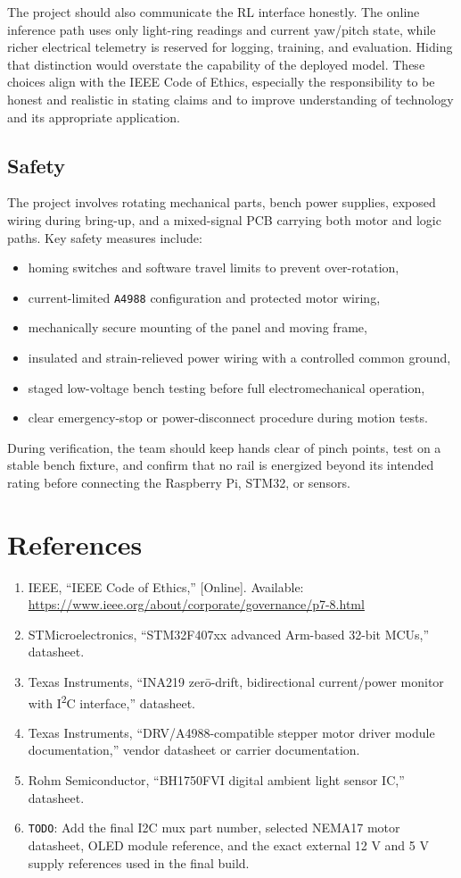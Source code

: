 \documentclass[11pt]{article}
\begin{document}
The project should also communicate the RL interface honestly. The online inference path uses only light-ring readings and current yaw/pitch state, while richer electrical telemetry is reserved for logging, training, and evaluation. Hiding that distinction would overstate the capability of the deployed model. These choices align with the IEEE Code of Ethics, especially the responsibility to be honest and realistic in stating claims and to improve understanding of technology and its appropriate application.

\subsection{Safety}
The project involves rotating mechanical parts, bench power supplies, exposed wiring during bring-up, and a mixed-signal PCB carrying both motor and logic paths. Key safety measures include:
\begin{itemize}
\item homing switches and software travel limits to prevent over-rotation,
\item current-limited \texttt{A4988} configuration and protected motor wiring,
\item mechanically secure mounting of the panel and moving frame,
\item insulated and strain-relieved power wiring with a controlled common ground,
\item staged low-voltage bench testing before full electromechanical operation,
\item clear emergency-stop or power-disconnect procedure during motion tests.
\end{itemize}

During verification, the team should keep hands clear of pinch points, test on a stable bench fixture, and confirm that no rail is energized beyond its intended rating before connecting the Raspberry Pi, STM32, or sensors.

\section{References}

\begin{enumerate}
\item IEEE, ``IEEE Code of Ethics,'' [Online]. Available: \url{https://www.ieee.org/about/corporate/governance/p7-8.html}
\item STMicroelectronics, ``STM32F407xx advanced Arm-based 32-bit MCUs,'' datasheet.
\item Texas Instruments, ``INA219 zer\=o-drift, bidirectional current/power monitor with I\textsuperscript{2}C interface,'' datasheet.
\item Texas Instruments, ``DRV/A4988-compatible stepper motor driver module documentation,'' vendor datasheet or carrier documentation.
\item Rohm Semiconductor, ``BH1750FVI digital ambient light sensor IC,'' datasheet.
\item \texttt{TODO}: Add the final I2C mux part number, selected NEMA17 motor datasheet, OLED module reference, and the exact external 12 V and 5 V supply references used in the final build.
\end{enumerate}
\end{document}
